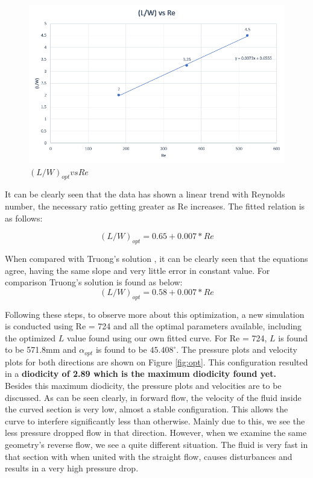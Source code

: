 \begin{figure}[H]
    \centering
    \includegraphics[width = .96\textwidth]{images/task2/LW_vs_Re.png}
    \caption{$(L/W)_{opt} vs Re$}
    \label{fig:LWvsRe}
\end{figure}


It can be clearly seen that the data has shown a linear trend with Reynolds number, the necessary ratio getting greater as Re increases. The fitted relation is as follows:

\begin{equation}
    (L/W)_{opt} = 0.65 + 0.007 * Re
\end{equation}

When compared with Truong's solution \cite{truong}, it can be clearly seen that the equations agree, having the same slope and very little error in constant value. For comparison Truong's solution is found as below:
\begin{equation}
    (L/W)_{opt} = 0.58 + 0.007 * Re
\end{equation}


Following these steps, to observe more about this optimization, a new simulation is conducted using Re = 724 and all the optimal parameters available, including the optimized $L$ value found using our own fitted curve. For Re = 724, $L$ is found to be 571.8mm and $\alpha_{opt}$ is found to be $45.408^\circ$. The pressure plots and velocity plots for both directions are shown on Figure \ref{fig:opt}. This configuration resulted in a \textbf{diodicity of 2.89 which is the maximum diodicity found yet.} \\

Besides this maximum diodicity, the pressure plots and velocities are to be discussed. As can be seen clearly, in forward flow, the velocity of the fluid inside the curved section is very low, almost a stable configuration. This allows the curve to interfere significantly less than otherwise. Mainly due to this, we see the less pressure dropped flow in that direction. However, when we examine the same geometry's reverse flow, we see a quite different situation. The fluid is very fast in that section with when united with the straight flow, causes disturbances and results in a very high pressure drop. \\

